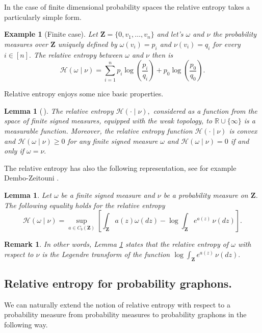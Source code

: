 \documentclass[12pt,twoside,a4paper]{article}
\newtheorem{lemma}[theorem]{Lemma}
\newtheorem{example}[theorem]{Example}
\newtheorem{remark}[theorem]{Remark}
\newcommand{\Space}{\mathbf{Z}}
\begin{document}
In the case of finite dimensional probability spaces the relative entropy takes a particularly simple form.

\begin{example}[Finite case]
Let $\Space=\{0,v_1,\dots, v_n\}$ and let's $\omega$ and $\nu$ the probability measures over $\Space$ uniquely defined by $\omega(v_i)=p_i$ and $\nu(v_i)=q_i$ for every $i\in [n].$ The relative entropy between $\omega$ and $\nu$ then is
\[
\mathcal{H}(\omega \mid \nu) = \sum^n_{i=1} p_i \log \left(\frac{p_i}{q_i}\right)+p_0\log\left(\frac{p_0}{q_0}\right).
\]
\end{example}

Relative entropy enjoys some nice basic properties.
\begin{lemma}[{\cite[Lemma~6.2.12]{dembo2009large}}\,]\label{Lemm:PropRelEntMeas}
The relative entropy $\mathcal{H}(\cdot \mid \nu),$ considered as a function from the space of finite signed measures, equipped with the weak topology, to $\mathbb{R}\cup \{\infty\}$ is a measurable function. Moreover, the relative entropy  function $\mathcal{H}(\cdot \mid \nu)$ is convex and $\mathcal{H}(\omega \mid \nu)\geq 0$ for any finite signed measure $\omega$ and $\mathcal{H}(\omega \mid \nu)= 0$ if and only if $\omega=\nu.$
\end{lemma}
The relative entropy has also the following representation, see for example Dembo-Zeitouni \cite[Lemma~6.2.13]{dembo2009large}.
\begin{lemma}\label{Lemm:RelativeEntropLegendre}
Let $\omega$ be a finite signed measure and $\nu$ be a probability measure on $\Space$. The following equality holds for the relative entropy
\[
\mathcal{H}(\omega \mid \nu) =  \sup_{a\in C_b(\Space)} \left[ \int_\Space a(z) \omega(dz) - \log \int_\Space e^{a(z)} \, \nu(dz) \right].
\]
\end{lemma}
\begin{remark}
In other words, Lemma \ref{Lemm:RelativeEntropLegendre} states that the relative entropy of $\omega$ with respect to $\nu$ is the Legendre transform of the function $\log \int_\Space e^{a(z)} \, \nu(d z).$
\end{remark}

\subsection{Relative entropy for probability graphons.}\label{subsection:RelatEntroProbGra}
We can naturally extend the notion of relative entropy with respect to a probability measure from probability measures to probability graphons in the following way. 
\end{document}
